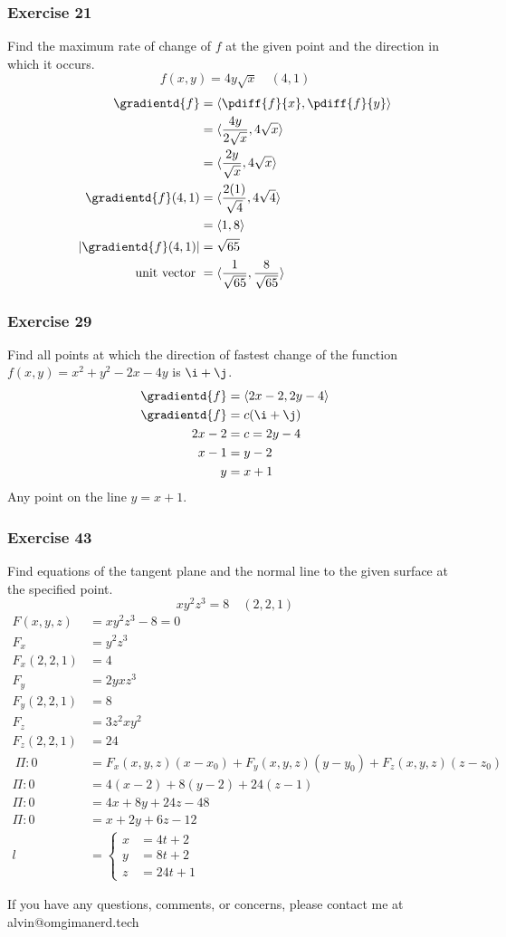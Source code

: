 \documentclass[letterpaper, 12pt]{math}
\begin{document}
\subsubsection*{Exercise 21}
Find the maximum rate of change of \( f \) at the given point and the direction
in which it occurs.
\[ f(x,y) = 4y\sqrt{x} \quad (4,1) \]
\begin{align*}
  \gradientd{f} &= \langle\pdiff{f}{x},\pdiff{f}{y}\rangle \\
  &= \langle\frac{4y}{2\sqrt{x}},4\sqrt{x}\rangle \\
  &= \langle\frac{2y}{\sqrt{x}},4\sqrt{x}\rangle \\
  \gradientd{f}(4,1) &= \langle\frac{2(1)}{\sqrt{4}},4\sqrt{4}\rangle \\
  &= \langle1,8\rangle \\
  |\gradientd{f}(4,1)| &= \sqrt{65} \\
  \text{unit vector } &= \langle\frac{1}{\sqrt{65}},\frac{8}{\sqrt{65}}\rangle
\end{align*}

\subsubsection*{Exercise 29}
Find all points at which the direction of fastest change of the function
\( f(x,y) = x^2+y^2-2x-4y \) is \( \i+\j \).
\begin{align*}
  \gradientd{f} &= \langle2x-2,2y-4\rangle \\
  \gradientd{f} &= c(\i+\j) \\
  2x-2 &= c = 2y-4 \\
  x-1 &= y-2 \\
  y &= x+1
\end{align*}
Any point on the line \( y = x+1 \).

\subsubsection*{Exercise 43}
Find equations of the tangent plane and the normal line to the given surface
at the specified point.
\[ xy^2z^3 = 8 \quad (2,2,1) \]
\begin{align*}
  F(x,y,z) &= xy^2z^3-8 = 0 \\
  F_x &= y^2z^3 \\
  F_x(2,2,1) &= 4 \\
  F_y &= 2yxz^3 \\
  F_y(2,2,1) &= 8 \\
  F_z &= 3z^2xy^2 \\
  F_z(2,2,1) &= 24 \\\
  \Pi: 0 &= F_x(x,y,z)(x-x_0)+F_y(x,y,z)(y-y_0)+F_z(x,y,z)(z-z_0) \\
  \Pi: 0 &= 4(x-2)+8(y-2)+24(z-1) \\
  \Pi: 0 &= 4x+8y+24z-48 \\
  \Pi: 0 &= x+2y+6z-12 \\
  l &= \begin{cases}
    x &= 4t+2 \\
    y &= 8t+2 \\
    z &= 24t+1
  \end{cases}
\end{align*}

\begin{center}
  If you have any questions, comments, or concerns, please contact me at
  alvin@omgimanerd.tech
\end{center}
\end{document}
